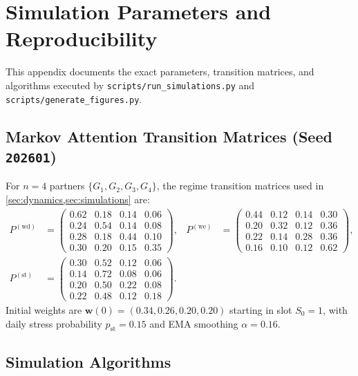 \section{Simulation Parameters and Reproducibility}
\label{app:reproducibility}

This appendix documents the exact parameters, transition matrices, and
algorithms executed by \texttt{scripts/run\_simulations.py} and
\texttt{scripts/generate\_figures.py}.

\subsection{Markov Attention Transition Matrices (Seed \texttt{202601})}
\label{app:rep-matrices}

For $n = 4$ partners $\{G_1, G_2, G_3, G_4\}$, the regime transition matrices
used in \cref{sec:dynamics,sec:simulations} are:
\begin{align*}
  P^{(\mathrm{wd})} &=
  \begin{pmatrix}
    0.62 & 0.18 & 0.14 & 0.06 \\
    0.24 & 0.54 & 0.14 & 0.08 \\
    0.28 & 0.18 & 0.44 & 0.10 \\
    0.30 & 0.20 & 0.15 & 0.35
  \end{pmatrix}, &
  P^{(\mathrm{we})} &=
  \begin{pmatrix}
    0.44 & 0.12 & 0.14 & 0.30 \\
    0.20 & 0.32 & 0.12 & 0.36 \\
    0.22 & 0.14 & 0.28 & 0.36 \\
    0.16 & 0.10 & 0.12 & 0.62
  \end{pmatrix}, \\[6pt]
  P^{(\mathrm{st})} &=
  \begin{pmatrix}
    0.30 & 0.52 & 0.12 & 0.06 \\
    0.14 & 0.72 & 0.08 & 0.06 \\
    0.20 & 0.50 & 0.22 & 0.08 \\
    0.22 & 0.48 & 0.12 & 0.18
  \end{pmatrix}.
\end{align*}
Initial weights are $\mathbf{w}(0) = (0.34, 0.26, 0.20, 0.20)$ starting in slot
$S_0 = 1$, with daily stress probability $p_{\mathrm{st}} = 0.15$ and EMA smoothing
$\alpha = 0.16$.

\subsection{Simulation Algorithms}
\label{app:rep-algos}

